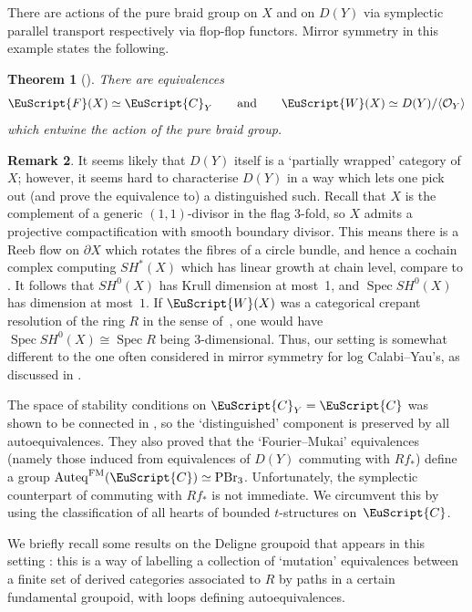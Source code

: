 \documentclass[10pt,a4paper]{amsart}
\DeclareMathOperator{\Auteq}{Auteq}
\newcommand{\scrF}{\EuScript{F}}
\newcommand{\scrC}{\EuScript{C}}
\def\scrW{\EuScript{W}}
\newtheorem{thm}{Theorem}[section]
\theoremstyle{definition}
\newtheorem{rmk}[thm]{Remark}
\numberwithin{equation}{section}
\begin{document}
There are actions of the pure braid group on $X$ and on $D(Y)$ via symplectic parallel transport respectively via flop-flop functors.
Mirror symmetry in this example states the following.

\begin{thm}[{\cite[Proposition 4.27\,(1) and Corollary 5.7]{Smith-Wemyss}}]
There are equivalences
\[
\scrF(X) \simeq \scrC_Y \qquad \mathrm{and} \qquad \scrW(X) \simeq D(Y)/\langle \mathcal{O}_Y \rangle
\]
which entwine the action of the pure braid group.
\end{thm}

\begin{rmk} It seems likely that $D(Y)$ itself is a `partially wrapped' category of $X$; however, it seems hard to characterise $D(Y)$ in a way which lets one pick out (and prove the equivalence to) a distinguished such. Recall that $X$ is the complement of a generic $(1,1)$-divisor in the flag 3-fold, so $X$ admits a projective compactification with smooth boundary divisor. This means there is a Reeb flow on $\partial X$ which rotates the fibres of a circle bundle, and hence a cochain complex computing $SH^*(X)$ which has linear growth at chain level, compare to \cite[Section~4a]{Seidel:bias}. It follows that $SH^0(X)$ has Krull dimension at most~1, and $\operatorname{Spec} SH^0(X)$ has dimension at most~$1$. If $\scrW(X)$ was a categorical crepant resolution of the ring $R$ in the sense of~\cite{Pomerleano}, one would have $\operatorname{Spec} SH^0(X) \cong \operatorname{Spec}R$ being 3-dimensional. Thus, our setting is somewhat different to the one often considered in mirror symmetry for log Calabi--Yau's, as discussed in \cite{Pomerleano}.
\end{rmk}

 The space of stability conditions on $\scrC_Y = \scrC$ was shown to be connected in \cite{Hara-Wemyss}, so the `distinguished' component is preserved by all autoequivalences. They also proved that the `Fourier--Mukai' equivalences (namely those induced from equivalences of $D(Y)$ commuting with $Rf_*$) define a group $\Auteq^{\rm FM}(\scrC) \simeq {\rm PBr}_3$. Unfortunately, the symplectic counterpart of commuting with $Rf_*$ is not immediate. We circumvent this by using the classification of all hearts of bounded $t$-structures on~$\scrC$.

We briefly recall some results on the Deligne groupoid that appears in this setting \cite{Donovan-Wemyss, Hara-Wemyss}: this is a way of labelling a collection of `mutation' equivalences between a finite set of derived categories associated to $R$ by paths in a certain fundamental groupoid, with loops defining autoequivalences.
\end{document}
